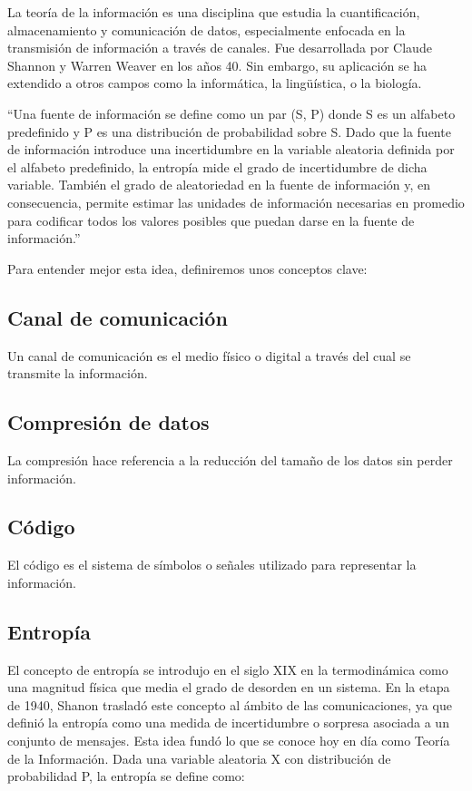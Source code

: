 \documentclass[11pt,spanish,listoffigures,listoftables]{tfgetsinf}
\begin{document}
La teoría de la información es una disciplina que estudia la cuantificación, almacenamiento y comunicación de datos, especialmente enfocada en la transmisión de información a través de canales. Fue desarrollada por Claude Shannon y Warren Weaver en los años 40. Sin embargo, su aplicación se ha extendido a otros campos como la informática, la lingüística, o la biología\cite{COV}.

“Una fuente de información se define como un par (S, P) donde S es un alfabeto predefinido y P es una distribución de probabilidad sobre S. Dado que la fuente de información introduce una incertidumbre en la variable aleatoria definida por el alfabeto predefinido, la entropía mide el grado de incertidumbre de dicha variable. También el grado de aleatoriedad en la fuente de información y, en consecuencia, permite estimar las unidades de información necesarias en promedio para codificar todos los valores posibles que puedan darse en la fuente de información.”\cite{fuentesupv}

Para entender mejor esta idea, definiremos unos conceptos clave:  

\subsection{Canal de comunicación }

Un canal de comunicación es el medio físico o digital a través del cual se transmite la información.  

\subsection{Compresión de datos}

La compresión hace referencia a la reducción del tamaño de los datos sin perder información.  

\subsection{Código}

El código es el sistema de símbolos o señales utilizado para representar la información. 

\subsection{Entropía} 

El concepto de entropía se introdujo en el siglo XIX en la termodinámica como una magnitud física que media el grado de desorden en un sistema. En la etapa de 1940, Shanon trasladó este concepto al ámbito de las comunicaciones, ya que definió la entropía como una medida de incertidumbre o sorpresa asociada a un conjunto de mensajes\cite[p.~4]{ROB}. Esta idea fundó lo que se conoce hoy en día como Teoría de la Información. Dada una variable aleatoria X con distribución de probabilidad P, la entropía se define como: 
\end{document}
